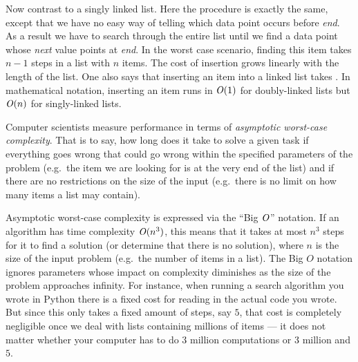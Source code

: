 \begin{programming}
Now contrast to a singly linked list.
Here the procedure is exactly the same, except that we have no easy way of telling which data point occurs before \emph{end}.
As a result we have to search through the entire list until we find a data point whose \emph{next} value points at \emph{end}.
In the worst case scenario, finding this item takes $n-1$ steps in a list with $n$ items.
The cost of insertion grows linearly with the length of the list.
One also says that inserting an item into a linked list takes .
In mathematical notation, inserting an item runs in $\mathit{O}(1)$ for doubly-linked lists but $\mathit{O}(n)$ for singly-linked lists.

\begin{techinfo}
    Computer scientists measure performance in terms of \emph{asymptotic worst-case complexity}.
    That is to say, how long does it take to solve a given task if everything goes wrong that could go wrong within the specified parameters of the problem (e.g.\ the item we are looking for is at the very end of the list) and if there are no restrictions on the size of the input (e.g.\ there is no limit on how many items a list may contain).

    Asymptotic worst-case complexity is expressed via the ``Big $\mathit{O}$'' notation.
    If an algorithm has time complexity $\mathit{O}(n^3)$, this means that it takes at most $n^3$ steps for it to find a solution (or determine that there is no solution), where $n$ is the size of the input problem (e.g.\ the number of items in a list).
    The Big $O$ notation ignores parameters whose impact on complexity diminishes as the size of the problem approaches infinity.
    For instance, when running a search algorithm you wrote in Python there is a fixed cost for reading in the actual code you wrote.
    But since this only takes a fixed amount of steps, say $5$, that cost is completely negligible once we deal with lists containing millions of items --- it does not matter whether your computer has to do 3 million computations or 3 million and $5$.


\end{techinfo}
\end{programming}
